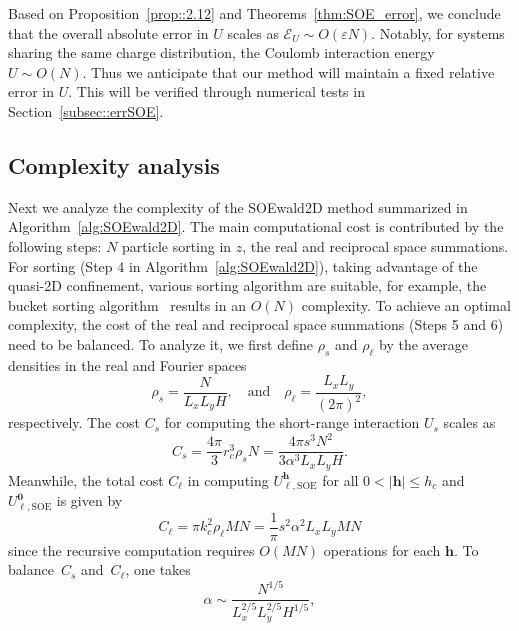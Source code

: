 Based on Proposition~\ref{prop::2.12} and Theorems~\ref{thm:SOE_error}, we conclude that the overall absolute error in $U$ scales as $\mathscr{E}_{U}\sim O(\varepsilon N)$. 
Notably, for systems sharing the same charge distribution, the Coulomb interaction energy $U \sim O(N)$. 
Thus we anticipate that our method will maintain a fixed relative error in $U$. 
This will be verified through numerical tests in Section~\ref{subsec::errSOE}.

\subsection{Complexity analysis}

Next we analyze the complexity of the SOEwald2D method summarized in Algorithm~\ref{alg:SOEwald2D}. 
The main computational cost is contributed by the following steps: $N$ particle sorting in $z$, the real and reciprocal space summations.
For sorting (Step 4 in Algorithm~\ref{alg:SOEwald2D}), taking advantage of the quasi-2D confinement, various sorting algorithm are suitable, for example, the bucket sorting algorithm~\cite{cormen2022introduction} results in an $O(N)$ complexity.
To achieve an optimal complexity, the cost of the real and reciprocal space summations (Steps 5 and 6) need to be balanced. 
To analyze it, we first define $\rho_{s}$ and $\rho_{\ell}$ by the average densities in the real and Fourier spaces 
\begin{equation}
	\rho_{s}=\frac{N}{L_x L_y H},\quad \text{and} \quad \rho_{\ell}=\frac{L_xL_y}{(2\pi)^2},
\end{equation}
respectively.
The cost $C_s$ for computing the short-range interaction $U_{s}$ scales as
\begin{equation}\label{eq::cs}
	C_{s}=\frac{4\pi}{3}r_c^3\rho_{s}N=\frac{4\pi s^3N^2}{3\alpha^3 L_x L_y H}.
\end{equation}
Meanwhile, the total cost $ C_{\ell}$ in computing $U_{\ell,\text{SOE}}^{\bm{h}}$ for all $0<|\bm{h}|\leq h_c$ and $U_{\ell,\text{SOE}}^{\bm{0}}$ is given by
\begin{equation}\label{eq::cll}
	C_{\ell} = \pi k_c^2\rho_{\ell}MN = \frac{1}{\pi}s^2 \alpha^2 L_x L_y M N
\end{equation}
since the recursive computation requires $O(MN)$ operations for each $\bm{h}$. 
To balance~$C_{s}$ and~$C_{\ell}$, one takes
\begin{equation}
	\alpha \sim \frac{N^{1/5}}{L_x^{2/5}L_y^{2/5}H^{1/5}},
\end{equation}
